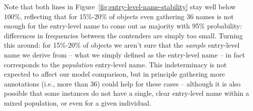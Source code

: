 Note that both lines in Figure~\ref{fig:entry-level-name-stability} stay well below 100\%, reflecting that for 15\%-20\% of objects even gathering 36 names is not enough for the entry-level name to come out as majority with 95\% probability: differences in frequencies between the contenders are simply too small.
Turning this around: for 15\%-20\% of objects we aren't sure that the \emph{sample} entry-level name we derive from \mn -- what we simply defined as the entry-level name -- in fact corresponds to the \emph{population} entry-level name.
This indeterminacy is not expected to affect our model comparison, but in principle gathering more annotations (i.e., more than 36) could help for these cases -- although it is also possible that some instances do not have a single, clear entry-level name within a mixed population, or even for a given individual.




